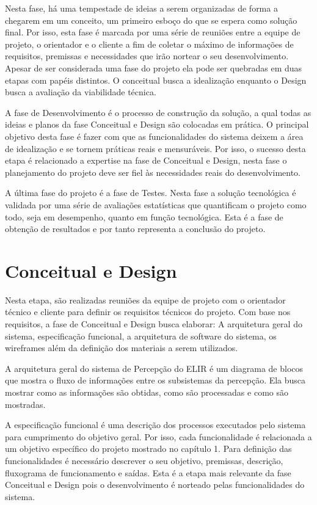 Nesta fase, há uma tempestade de ideias a serem organizadas de forma a chegarem em um conceito, um primeiro esboço do que se espera como solução final. Por isso, esta fase é marcada por uma série de reuniões entre a equipe de projeto, o orientador e o cliente a fim de coletar o máximo de informações de requisitos, premissas e necessidades que irão nortear o seu desenvolvimento. Apesar de ser considerada uma fase do projeto ela pode ser quebradas em duas etapas com papéis distintos. O conceitual busca a idealização enquanto o Design busca a avaliação da viabilidade técnica.

A fase de Desenvolvimento é o processo de construção da solução, a qual todas as ideias e planos da fase Conceitual e Design são colocadas em prática. O principal objetivo desta fase é fazer com que as funcionalidades do sistema deixem a área de idealização e se tornem práticas reais e mensuráveis. Por isso, o sucesso desta etapa é relacionado a expertise na fase de Conceitual e Design, nesta fase o planejamento do projeto deve ser fiel às necessidades reais do desenvolvimento.

A última fase do projeto é a fase de Testes. Nesta fase a solução tecnológica é validada por uma série de avaliações estatísticas que quantificam o projeto como todo, seja em desempenho, quanto em função tecnológica.  Esta é a fase de obtenção de resultados e por tanto representa a conclusão do projeto.


\section{Conceitual e Design}
Nesta etapa, são realizadas reuniões da equipe de projeto com o orientador técnico e cliente para definir os requisitos técnicos do projeto. Com base nos requisitos, a fase de Conceitual e Design busca elaborar: A arquitetura geral do sistema, especificação funcional, a arquitetura de software do sistema, os wireframes além da definição dos materiais a serem utilizados.

A arquitetura geral do sistema de Percepção do ELIR é um diagrama de blocos que mostra o fluxo de informações entre os subsistemas da percepção. Ela busca mostrar como as informações são obtidas, como são processadas e como são mostradas. 

A especificação funcional é uma descrição dos processos executados pelo sistema para cumprimento do objetivo geral. Por isso, cada funcionalidade é relacionada a um objetivo específico do projeto mostrado no capítulo 1. Para definição das funcionalidades é necessário descrever o seu objetivo, premissas, descrição, fluxograma de funcionamento e saídas. Esta é a etapa mais relevante da fase Conceitual e Design pois o desenvolvimento é norteado pelas funcionalidades do sistema. 

